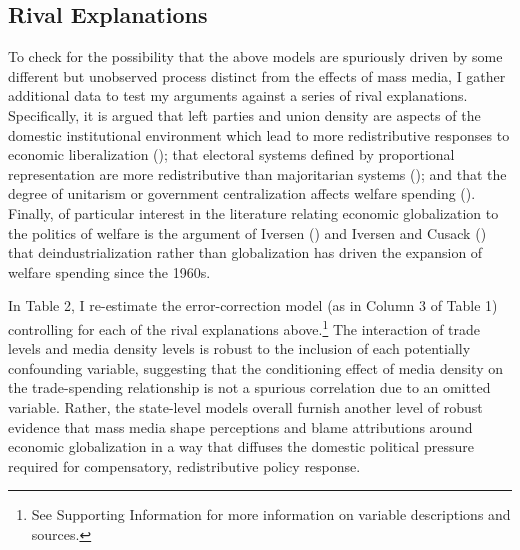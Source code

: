 \documentclass[12pt]{report}
\begin{document}
\begin{singlespace}
\begin{center}

\end{center}
\end{singlespace}

\subsection{Rival Explanations}

To check for the possibility that the above models are spuriously driven by some different but
unobserved process distinct from the effects of mass media, I gather additional data to test my
arguments against a series of rival explanations. Specifically, it is argued that left parties and
union density are aspects of the domestic institutional environment which lead to more
redistributive responses to economic liberalization (\citealt[674]{Garrett:1995tj}); that electoral
systems defined by proportional representation are more redistributive than majoritarian systems
(\citealt{Iversen:2006wd}); and that the degree of unitarism or government centralization affects
welfare spending (\citealt[72]{Crepaz:1998vj}). Finally, of particular interest in the literature
relating economic globalization to the politics of welfare is the argument of Iversen
(\citeyear{Iversen:2001vr}) and Iversen and Cusack (\citeyear{Iversen:2000ch}) that
deindustrialization rather than globalization has driven the expansion of welfare spending since the
1960s.

In Table 2, I re-estimate the error-correction model (as in Column 3 of Table 1) controlling for
each of the rival explanations above.\footnote{See Supporting Information for more information on
variable descriptions and sources.} The interaction of trade levels and media density levels is
robust to the inclusion of each potentially confounding variable, suggesting that the conditioning
effect of media density on the trade-spending relationship is not a spurious correlation due to an
omitted variable. Rather, the state-level models overall furnish another level of robust evidence
that mass media shape perceptions and blame attributions around economic globalization in a way that
diffuses the domestic political pressure required for compensatory, redistributive policy response.

\begin{singlespace}
\begin{center}

\end{center}
\end{singlespace}
\end{document}

